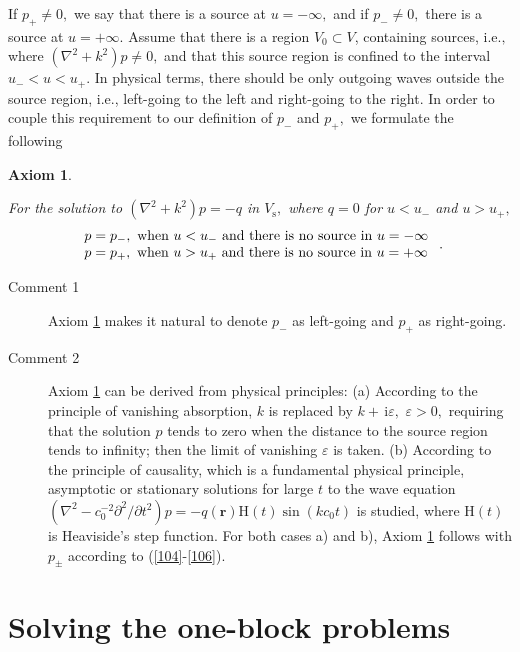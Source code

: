 \documentclass[numreferences]{kluwer}
\newtheorem{axiom}{Axiom}
\renewcommand{\i}{\,\mathrm{i}}
\begin{document}
If $p_{+}\neq0,$ we say that there is a source at $u=-\infty,$
and if $p_{-}\neq0,$ there is a source at $u=+\infty.$ Assume that
there is a region $V_{0}\subset V$, containing sources, i.e.$,$ where
$(\nabla^{2}+k^{2}%
)p\neq0,$ and that this source region is confined to the interval
$u_{-}<u<u_{+}.$ In physical terms, there should be only outgoing
waves outside the source region, i.e., left-going to the left and
right-going to the right. In order to couple this requirement to our
definition of $p_{-}$ and $p_{+},$ we formulate the following

\begin{axiom}
  \label{axiom1}
\item For the solution to $(\nabla^{2}+k^{2})p=-q$ in $V_{\text{s}},$
  where $q=0$ for $u<u_{-}$ and $u>u_{+},$%
  \[
  \left.
    \begin{array} [c]{l}%
      p=p_{-},\text{ when }u<u_{-}
      \text{ and there is no source in }u=-\infty\\
      p=p_{+},\text{ when }u>u_{+}
      \text{ and there is no source in }u=+\infty
    \end{array}
  \right.  .
  \]
\end{axiom}

\begin{description}
\item[Comment 1] Axiom \ref{axiom1} makes it natural to denote $p_{-}$
  as left-going and $p_{+}$ as right-going.

\item[Comment 2] Axiom \ref{axiom1} can be derived from physical
  principles: (a) According to the principle of vanishing absorption,
  $k$ is replaced by $k+\i\varepsilon,$ $\varepsilon>0,$ requiring
  that the solution $p$ tends to zero when the distance to the source
  region tends to infinity; then the limit of vanishing $\varepsilon$
  is taken. (b) According to the principle of causality, which is a
  fundamental physical principle, asymptotic or stationary solutions
  for large $t$ to the wave equation $(\nabla^{2}-c_{0}^{-2}%
  \partial^{2}/\partial t^{2})p=-q(\bm{r})$H$(t)\sin(kc_{0}t)$ is
  studied, where H$(t)$ is Heaviside's step function. For both cases
  a) and b), Axiom \ref{axiom1} follows with $p_{\pm}$ according to
  (\ref{104}-\ref{106}).
\end{description}

\section{Solving the one-block problems}
\label{sec:oneblock}
\end{document}
